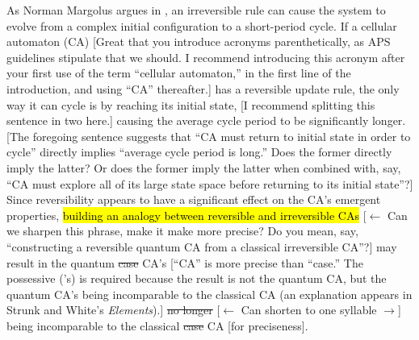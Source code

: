 \documentclass[11pt]{article}
\newcommand{\nicole}[1]{{\color{Green}#1}}
\begin{document}
\begin{multicols}{2}
As Norman Margolus argues in \cite{Margolus}\nicole{,} an irreversible rule can cause the system to evolve from a complex initial configuration to a short-period cycle. If a cellular automaton (CA) 
\nicole{[Great that you introduce acronyms parenthetically, as APS guidelines stipulate that we should. I recommend introducing this acronym after your first use of the term ``cellular automaton,'' in the first line of the introduction, and using ``CA'' thereafter.]}
has a reversible update rule, the only way it can cycle is by reaching its initial state, 
\nicole{[I recommend splitting this sentence in two here.]}
causing the average cycle period to be significantly longer. 
\nicole{[The foregoing sentence suggests that ``CA must return to initial state in order to cycle'' directly implies ``average cycle period is long.'' Does the former directly imply the latter? Or does the former imply the latter when combined with, say, ``CA must explore all of its large state space before returning to its initial state''?]}
Since reversibility appears to have a significant effect on the CA's emergent properties, \hl{building an analogy between reversible and irreversible CAs}
\nicole{[$\leftarrow$ Can we sharpen this phrase, make it make more precise? Do you mean, say, ``constructing a reversible quantum CA from a classical irreversible CA''?]}
may result in the quantum \sout{case} \nicole{CA's [``CA'' is more precise than ``case.'' The possessive ('s) is required because the result is not the quantum CA, but the quantum CA's being incomparable to the classical CA (an explanation appears in Strunk and White's \emph{Elements}).]} \sout{no longer} \nicole{[$\leftarrow$ Can shorten to one syllable $\to$]} being \nicole{in}comparable to the classical \sout{case} \nicole{CA [for preciseness]}.


\end{multicols}
\end{document}
